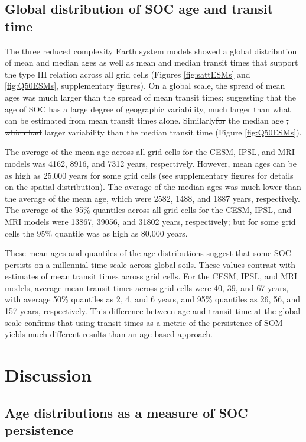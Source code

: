 \documentclass[draft,linenumbers]{agujournal}
\providecommand{\DIFadd}[1]{{\protect\color{blue}\uwave{#1}}} %
\providecommand{\DIFdel}[1]{{\protect\color{red}\sout{#1}}}                      %
\providecommand{\DIFaddbegin}{} %
\providecommand{\DIFaddend}{} %
\providecommand{\DIFdelbegin}{} %
\providecommand{\DIFdelend}{} %
\begin{document}
\subsection{Global distribution of SOC age and transit time}
The three reduced complexity Earth system models showed a global distribution of mean and median ages as well as mean and median transit times that support the type III relation across all grid cells (Figures \ref{fig:sattESMs} and \ref{fig:Q50ESMs}, supplementary figures). On a global scale, the spread of mean ages was much larger than the spread of mean transit times; suggesting that the age of SOC has a large degree of geographic variability, much larger than what can be estimated from mean transit times alone. Similarly\DIFdelbegin \DIFdel{for }\DIFdelend \DIFaddbegin \DIFadd{, }\DIFaddend the median age \DIFdelbegin \DIFdel{, which had }\DIFdelend \DIFaddbegin \DIFadd{had a }\DIFaddend larger variability than the median transit time (Figure \ref{fig:Q50ESMs}).

The average of the mean age across all grid cells for the CESM, IPSL, and MRI models was 4162, 8916, and 7312 years, respectively. However, mean ages can be as high as 25,000 years for some grid cells (see supplementary figures for details on the spatial distribution). The average of the median ages was much lower than the average of the mean age, which were 2582, 1488, and 1887 years, respectively. 
The average of the 95\% quantiles across all grid cells for the CESM, IPSL, and MRI models were 13867, 39056, and 31802 years, respectively; but for some grid cells the 95\% quantile was as high as 80,000 years. 

These mean ages and quantiles of the age distributions suggest that some SOC persists on a millennial time scale across global soils. These values contrast with estimates of mean transit times across grid cells. For the CESM, IPSL, and MRI models, average mean transit times across grid cells were 40, 39, and 67 years, with average 
50\% quantiles as 2, 4, and 6 years, and 
95\% quantiles as 26,  56, and 157 years, respectively. This difference between age and transit time at the global scale confirms that using transit times as a metric of the persistence of SOM yields much different results than an age-based approach.


\section{Discussion}
\subsection{Age distributions as a measure of SOC persistence}
\end{document}
